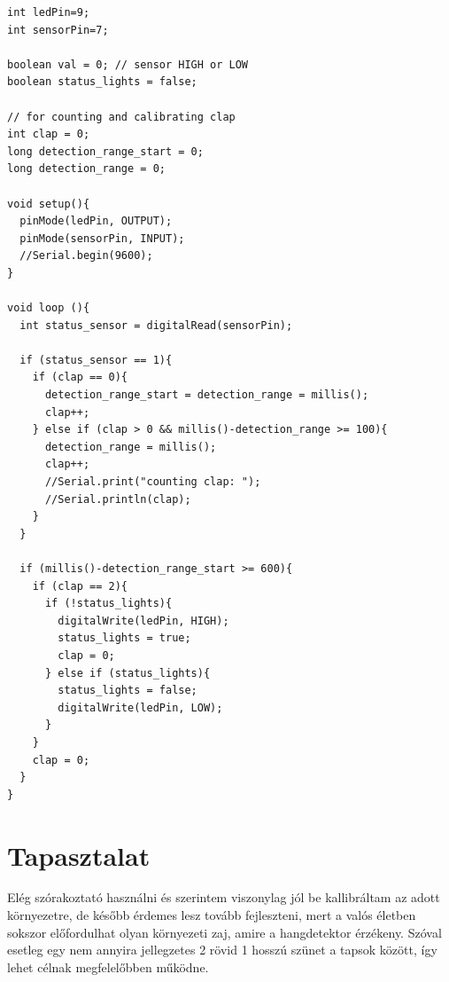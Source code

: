 \documentclass[a4paper,11pt]{article}
\begin{document}
\begin{lstlisting}
int ledPin=9;
int sensorPin=7;

boolean val = 0; // sensor HIGH or LOW
boolean status_lights = false;

// for counting and calibrating clap
int clap = 0;
long detection_range_start = 0;
long detection_range = 0;

void setup(){
  pinMode(ledPin, OUTPUT);
  pinMode(sensorPin, INPUT);
  //Serial.begin(9600);
}
  
void loop (){
  int status_sensor = digitalRead(sensorPin);
  
  if (status_sensor == 1){
    if (clap == 0){
      detection_range_start = detection_range = millis();
      clap++; 
    } else if (clap > 0 && millis()-detection_range >= 100){
      detection_range = millis();
      clap++;
      //Serial.print("counting clap: ");
      //Serial.println(clap);
    }
  }
  
  if (millis()-detection_range_start >= 600){
    if (clap == 2){ 
      if (!status_lights){
        digitalWrite(ledPin, HIGH);
        status_lights = true;
        clap = 0;
      } else if (status_lights){
        status_lights = false;
        digitalWrite(ledPin, LOW);
      }
    }
    clap = 0;
  }
}
\end{lstlisting} 

\section{Tapasztalat}

Elég szórakoztató használni és szerintem viszonylag jól be kallibráltam az adott környezetre, de később érdemes lesz tovább fejleszteni, mert a valós életben sokszor előfordulhat olyan környezeti zaj, amire a hangdetektor érzékeny. Szóval esetleg egy nem annyira jellegzetes 2 rövid 1 hosszú szünet a tapsok között, így lehet célnak megfelelőbben működne.
\end{document}
